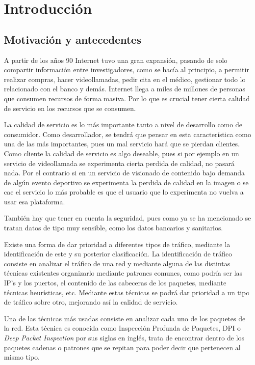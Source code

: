 \chapter{Introducción}

\section{Motivación y antecedentes}

A partir de los años 90 Internet tuvo una gran expansión, pasando de solo compartir información entre investigadores, 
como se hacía al principio, a permitir realizar compras, hacer videollamadas, pedir cita en el médico, gestionar 
todo lo relacionado con el banco y demás. Internet llega a miles de millones de personas que consumen recursos de forma masiva. 
Por lo que es crucial tener cierta calidad de servicio \cite{microqos} en los recursos que se consumen.

\intro La calidad de servicio es lo más importante tanto a nivel de desarrollo como de consumidor. Como desarrollador, 
se tendrá que pensar en esta característica como una de las más importantes, pues un mal servicio hará que se pierdan 
clientes. Como cliente la calidad de servicio es algo deseable, pues si por ejemplo en un servicio de videollamada se 
experimenta cierta perdida de calidad, no pasará nada. Por el contrario si en un servicio de visionado de contenido 
bajo demanda de algún evento deportivo se experimenta la perdida de calidad en la imagen o se cae el servicio lo más 
probable es que el usuario que lo experimenta no vuelva a usar esa plataforma. \cite{redes2010a}

\intro También hay que tener en cuenta la seguridad, pues como ya se ha mencionado se tratan datos de tipo muy sensible, 
como los datos bancarios y sanitarios.

\intro Existe una forma de dar prioridad a diferentes tipos de tráfico, mediante la identificación de este y su posterior 
clasificación. La identificación de tráfico consiste en analizar el tráfico de una red y mediante alguna de las distintas 
técnicas existentes organizarlo mediante patrones comunes, como podría ser las IP's y los puertos, el contenido de las 
cabeceras de los paquetes, mediante técnicas heurísticas, etc. Mediante estas técnicas se podrá dar prioridad a un tipo 
de tráfico sobre otro, mejorando así la calidad de servicio.

\intro Una de las técnicas más usadas consiste en analizar cada uno de los paquetes de la red. Esta técnica es conocida como 
Inspección Profunda de Paquetes, DPI o \textit{Deep Packet Inspection} \cite{dpiaproximacion} por sus siglas en inglés, 
trata de encontrar dentro de los paquetes cadenas o patrones que se repitan para poder decir que pertenecen al mismo tipo. 

